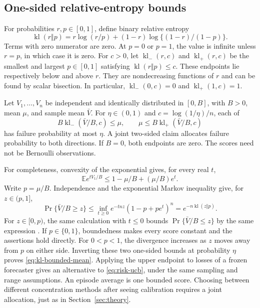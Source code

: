 \subsection{One-sided relative-entropy bounds}
\label{app:kl-calibration}

For probabilities $r,p\in[0,1]$, define binary relative entropy
\[
 \operatorname{kl}(r\Vert p)
 =r\log(r/p)+(1-r)\log\{(1-r)/(1-p)\}.
\]
Terms with zero numerator are zero. At $p=0$ or $p=1$, the value is
infinite unless $r=p$, in which case it is zero. For $c>0$, let
$\operatorname{kl}_-(r,c)$ and $\operatorname{kl}_+(r,c)$ be the smallest
and largest $p\in[0,1]$ satisfying $\operatorname{kl}(r\Vert p)\leq c$.
These endpoints lie respectively below and above $r$. They are
nondecreasing functions of $r$ and can be found by scalar bisection.
In particular,
$\operatorname{kl}_-(0,c)=0$ and
$\operatorname{kl}_+(1,c)=1$.

Let $V_1,\ldots,V_n$ be independent and identically distributed in
$[0,B]$, with $B>0$, mean $\mu$, and sample mean $\bar V$.
For $\eta\in(0,1)$ and $c=\log(1/\eta)/n$, each of
\begin{equation}
 B\operatorname{kl}_-(\bar V/B,c)\leq\mu,
 \qquad
 \mu\leq B\operatorname{kl}_+(\bar V/B,c)
 \label{eq:kl-bounded-mean}
\end{equation}
has failure probability at most $\eta$. A joint two-sided claim allocates
failure probability to both directions. If $B=0$, both endpoints are zero.
The scores need not be Bernoulli observations.

For completeness, convexity of the exponential gives, for every real $t$,
\[
 \mathbb E e^{tV_1/B}
 \leq 1-\mu/B+(\mu/B)e^t.
\]
Write $p=\mu/B$. Independence and the exponential Markov inequality give,
for $z\in(p,1]$,
\[
 \Pr\{\bar V/B\geq z\}
 \leq\inf_{t\geq0}e^{-tnz}(1-p+pe^t)^n
 =e^{-n\operatorname{kl}(z\Vert p)}.
\]
For $z\in[0,p)$, the same calculation with $t\leq0$ bounds
$\Pr\{\bar V/B\leq z\}$ by the same expression
\citep{hoeffding1963}. If $p\in\{0,1\}$, boundedness makes every score
constant and the assertions hold directly. For $0<p<1$, the divergence
increases as $z$ moves away from $p$ on either side. Inverting these
two one-sided bounds at probability $\eta$ proves
\eqref{eq:kl-bounded-mean}.
Applying the upper endpoint to losses of a frozen forecaster gives an
alternative to \eqref{eq:risk-ucb}, under the same sampling and range
assumptions. An episode average is one bounded score. Choosing between
different concentration methods after seeing calibration requires a joint
allocation, just as in Section~\ref{sec:theory}.

